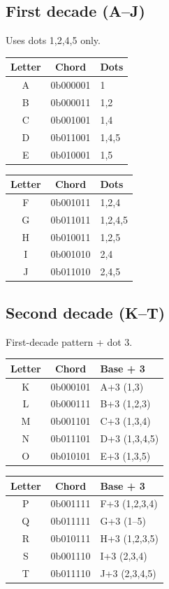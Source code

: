 \documentclass[11pt,a4paper,twoside]{article}
\begin{document}
\subsection{First decade (A--J)}
Uses dots 1,2,4,5 only.\hfill
\begin{minipage}{0.45\textwidth}
\begin{tabular}{c c l}\toprule
\textbf{Letter} & \textbf{Chord} & \textbf{Dots} \\\midrule
A & 0b000001 & 1 \\
B & 0b000011 & 1,2 \\
C & 0b001001 & 1,4 \\
D & 0b011001 & 1,4,5 \\
E & 0b010001 & 1,5 \\\bottomrule
\end{tabular}
\end{minipage}\hfill
\begin{minipage}{0.45\textwidth}
\begin{tabular}{c c l}\toprule
\textbf{Letter} & \textbf{Chord} & \textbf{Dots} \\\midrule
F & 0b001011 & 1,2,4 \\
G & 0b011011 & 1,2,4,5 \\
H & 0b010011 & 1,2,5 \\
I & 0b001010 & 2,4 \\
J & 0b011010 & 2,4,5 \\\bottomrule
\end{tabular}
\end{minipage}

\subsection{Second decade (K--T)}
First-decade pattern + dot 3.\hfill
\begin{minipage}{0.45\textwidth}
\begin{tabular}{c c l}\toprule
\textbf{Letter} & \textbf{Chord} & \textbf{Base + 3} \\\midrule
K & 0b000101 & A+3 (1,3) \\
L & 0b000111 & B+3 (1,2,3) \\
M & 0b001101 & C+3 (1,3,4) \\
N & 0b011101 & D+3 (1,3,4,5) \\
O & 0b010101 & E+3 (1,3,5) \\\bottomrule
\end{tabular}
\end{minipage}\hfill
\begin{minipage}{0.45\textwidth}
\begin{tabular}{c c l}\toprule
\textbf{Letter} & \textbf{Chord} & \textbf{Base + 3} \\\midrule
P & 0b001111 & F+3 (1,2,3,4) \\
Q & 0b011111 & G+3 (1--5) \\
R & 0b010111 & H+3 (1,2,3,5) \\
S & 0b001110 & I+3 (2,3,4) \\
T & 0b011110 & J+3 (2,3,4,5) \\\bottomrule
\end{tabular}
\end{minipage}
\end{document}
